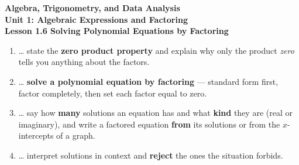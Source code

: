\documentclass[10pt]{article}
\begin{document}
\vspace{-0.8in}

\begin{center}
  {\color{white}\textbf{\LARGE Algebra, Trigonometry, and Data Analysis}}\\[4pt]
  {\color{mistmid}\large\textbf{Unit 1: Algebraic Expressions and Factoring}}\\[6pt]
  {\color{white}\textbf{\large Lesson 1.6 \quad Solving Polynomial Equations by Factoring}}
\end{center}

\vspace{0.22in}
\namedateperiod
\vspace{0.18in}

\begin{learningtargetbox}
\small
\begin{enumerate}[leftmargin=1.5em, itemsep=5pt]
  \item \ldots{} state the \textbf{zero product property} and explain why only the product
        \emph{zero} tells you anything about the factors.
  \item \ldots{} \textbf{solve a polynomial equation by factoring} --- standard form first, factor
        completely, then set each factor equal to zero.
  \item \ldots{} say how \textbf{many} solutions an equation has and what \textbf{kind} they are
        (real or imaginary), and write a factored equation \textbf{from} its solutions or from the
        $x$-intercepts of a graph.
  \item \ldots{} interpret solutions in context and \textbf{reject} the ones the situation forbids.
\end{enumerate}
\end{learningtargetbox}

\vspace{0.14in}
\end{document}
